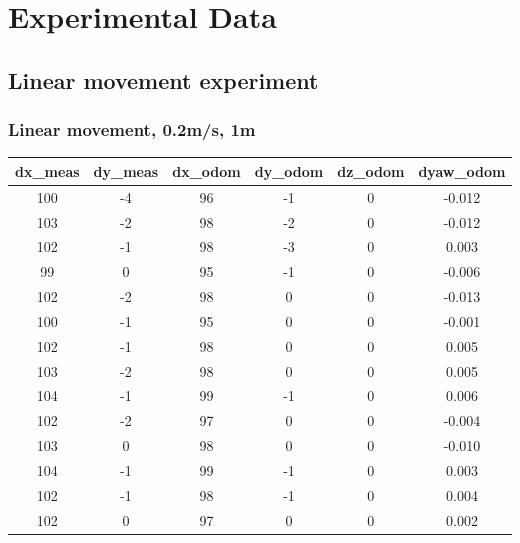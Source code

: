 \documentclass[a4paper, 12pt]{article}
\begin{document}
    \section{Experimental Data}
    \label{appendix:experimental_data}

    \subsection{Linear movement experiment}
    \subsubsection{Linear movement, 0.2m/s, 1m}
    \begin{table}[H]
    \scriptsize
    \begin{tabular}{@{}cccccc@{}}
    \toprule
    \textbf{dx\_meas} & \textbf{dy\_meas} & \textbf{dx\_odom} & \textbf{dy\_odom} & \textbf{dz\_odom} & \textbf{dyaw\_odom} \\ \midrule
    100          & -4           & 96       & -1       & 0        & -0.012     \\
    103          & -2           & 98       & -2       & 0        & -0.012     \\
    102          & -1           & 98       & -3       & 0        & 0.003      \\
    99           & 0            & 95       & -1       & 0        & -0.006     \\
    102          & -2           & 98       & 0        & 0        & -0.013     \\
    100          & -1           & 95       & 0        & 0        & -0.001     \\
    102          & -1           & 98       & 0        & 0        & 0.005      \\
    103          & -2           & 98       & 0        & 0        & 0.005      \\
    104          & -1           & 99       & -1       & 0        & 0.006      \\
    102          & -2           & 97       & 0        & 0        & -0.004     \\
    103          & 0            & 98       & 0        & 0        & -0.010     \\
    104          & -1           & 99       & -1       & 0        & 0.003      \\
    102          & -1           & 98       & -1       & 0        & 0.004      \\
    102          & 0            & 97       & 0        & 0        & 0.002      \\

\end{tabular}
\end{table}
\end{document}
